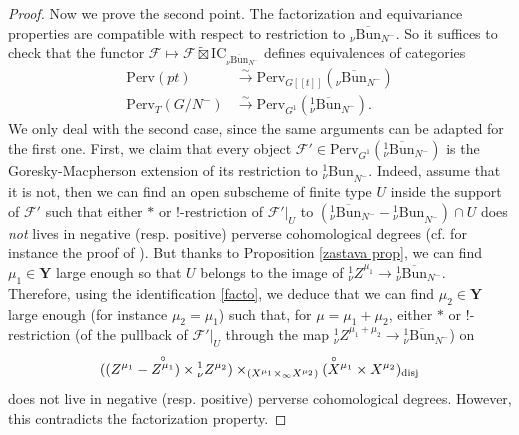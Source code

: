 \documentclass[11pt]{amsart}
\theoremstyle{plain}
\theoremstyle{remark}
\numberwithin{equation}{section}
\begin{document}
\begin{proof}
		Now we prove the second point. The factorization and equivariance properties are compatible with respect to restriction to $_{\nu}\overline{\mathrm{Bun}}_{N^-}$. So it suffices to check that the functor $\mathcal{F}\mapsto \mathcal{F}\widetilde{\boxtimes}\mathrm{IC}_{_{\nu}\overline{\mathrm{Bun}}_{N^-}}$ defines equivalences of categories
		\begin{align*}
  \mathrm{Perv}(pt)&\xrightarrow{\sim}  \mathrm{Perv}_{G[[t]]}({_\nu\overline{\mathrm{Bun}}_{N^-}})\\
		    \mathrm{Perv}_T(G/N^-)&\xrightarrow{\sim}  \mathrm{Perv}_{G^1}({_\nu^1\overline{\mathrm{Bun}}_{N^-}}).
		\end{align*}
		We only deal with the second case, since the same arguments can be adapted for the first one.  First, we claim that every object $ \mathcal{F}'\in \mathrm{Perv}_{G^1}({_\nu^1\overline{\mathrm{Bun}}_{N^-}})$ is the Goresky-Macpherson extension of its restriction to ${_\nu^1\mathrm{Bun}}_{N^-}$. Indeed, assume that it is not, then we can find an open subscheme of finite type $U$ inside the support of $\mathcal{F}'$ such that either $*$ or $!$-restriction of $\mathcal{F}'|_{U}$ to $({_\nu^1\overline{\mathrm{Bun}}_{N^-}}- {_\nu^1\mathrm{Bun}}_{N^-})\cap U$ does \textit{not} lives in negative (resp. positive) perverse cohomological degrees (cf. for instance the proof of \cite[Lemma 3.3.3]{achar2021perverse}). But thanks to Proposition \ref{zastava prop}, we can find  $\mu_1\in\mathbf{Y}$ large enough so that $U$ belongs to the image of ${_\nu ^1Z}^{\mu_1}\to {_\nu^1\overline{\mathrm{Bun}}_{N^-}}$. Therefore, using the identification \eqref{facto}, we deduce that we can find $\mu_2\in\mathbf{Y}$ large enough (for instance $\mu_2=\mu_1$) such that, for $\mu=\mu_1+\mu_2$, either $*$ or $!$-restriction (of the pullback of $ \mathcal{F}'|_{U}$ through the map ${_\nu ^1Z}^{\mu_1+\mu_2}\to {_\nu^1\overline{\mathrm{Bun}}_{N^-}}$) on 
		$$((Z^{\mu_1}-\overset{\circ}{Z^{\mu_1}})\times {^1_\nu Z^{\mu_2}})\times_{(X^{\mu_1}\times{_\infty X^{\mu_2}})}(\smash[t]{\overset{\circ}{X}}^{\mu_1}\times X^{\mu_2})_{\mathrm{disj}}$$
		does not live in negative (resp. positive) perverse cohomological degrees. However, this contradicts the factorization property.
		

\end{proof}
\end{document}
